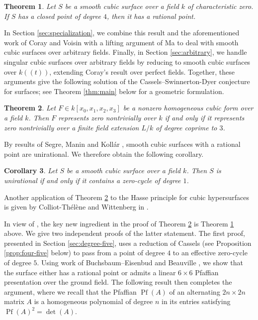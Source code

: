 \documentclass[a4paper,11pt]{amsart}
\numberwithin{equation}{section}
\newtheorem{theorem}{Theorem}[section]
\newtheorem{corollary}[theorem]{Corollary}
\theoremstyle{definition}
\theoremstyle{remark}
\begin{document}
\begin{theorem}\label{thm:deg=4-intro}
Let $S$ be a smooth cubic surface over a field $k$ of characteristic zero.
If $S$ has a closed point of degree $4$, then it has a rational point.
\end{theorem}

In Section \ref{sec:specialization}, we combine this result and the aforementioned work of Coray and Voisin with a lifting argument of Ma \cite{ma} to deal with smooth cubic surfaces over arbitrary fields.
Finally, in Section \ref{sec:arbitrary}, we handle singular cubic surfaces over arbitrary fields by reducing to smooth cubic surfaces over $k((t))$, extending Coray's result over perfect fields.
Together, these arguments give the following solution of the Cassels--Swinnerton-Dyer conjecture for surfaces; see Theorem \ref{thm:main} below for a geometric formulation.

\begin{theorem}\label{thm:main:intro}
Let $F\in k[x_0,x_1,x_2,x_3]$ be a nonzero
homogeneous cubic form over a field $k$.
Then $F$ represents zero nontrivially over $k$ if and only if it represents zero nontrivially over a finite field extension $L/k$ of degree coprime to $3$. 
\end{theorem}



By results of Segre, Manin \cite{manin} and Koll\'ar \cite{kollar}, smooth cubic surfaces with a rational point are unirational.
We therefore obtain the following corollary.

\begin{corollary} \label{cor:unirational}
Let $S$ be a smooth cubic surface over a field $k$.
Then $S$ is unirational if and only if it contains a zero-cycle of degree $1$.
\end{corollary}



Another application of Theorem \ref{thm:main:intro} to the Hasse principle for cubic hypersurfaces is given by Colliot-Thélène and Wittenberg in \cite{CTW}.


 

In view of \cite{coray,ma,voisin-coray}, the key new ingredient in the proof of Theorem \ref{thm:main:intro} is Theorem \ref{thm:deg=4-intro} above.
We give two independent proofs of the latter statement. 
The first proof, presented in Section \ref{sec:degree-five}, uses a reduction of Cassels (see Proposition \ref{prop:four-five} below) to pass from a point of degree $4$ to an effective zero-cycle of degree $5$.
Using work of Buchsbaum--Eisenbud \cite{BE} and Beauville \cite{Beauville}, we show that the surface either has a rational point or admits a linear \(6\times6\) Pfaffian presentation over the ground field. 
The following result then completes the argument, where 
we recall that the Pfaffian $\operatorname{Pf}(A)$ of an alternating
$2n\times 2n$ matrix $A$ is a homogeneous polynomial of degree $n$
in its entries satisfying $\operatorname{Pf}(A)^2=\det(A)$.
\end{document}
